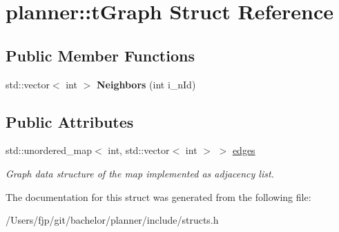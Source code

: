 \hypertarget{structplanner_1_1t_graph}{}\section{planner\+:\+:t\+Graph Struct Reference}
\label{structplanner_1_1t_graph}
\subsection*{Public Member Functions}
\begin{DoxyCompactItemize}
\item 
\mbox{\label{structplanner_1_1t_graph_a21e8328897b7740c1197777b597cf74c}} 
std\+::vector$<$ int $>$ {\bfseries Neighbors} (int i\+\_\+n\+Id)
\end{DoxyCompactItemize}
\subsection*{Public Attributes}
\begin{DoxyCompactItemize}
\item 
\mbox{\label{structplanner_1_1t_graph_a7333fa0b01c18f90560241eed5ba3a08}} 
std\+::unordered\+\_\+map$<$ int, std\+::vector$<$ int $>$ $>$ \mbox{\hyperlink{structplanner_1_1t_graph_a7333fa0b01c18f90560241eed5ba3a08}{edges}}
\begin{DoxyCompactList}\small\item\em Graph data structure of the map implemented as adjacency list. \end{DoxyCompactList}\end{DoxyCompactItemize}


The documentation for this struct was generated from the following file\+:\begin{DoxyCompactItemize}
\item 
/\+Users/fjp/git/bachelor/planner/include/structs.\+h\end{DoxyCompactItemize}
